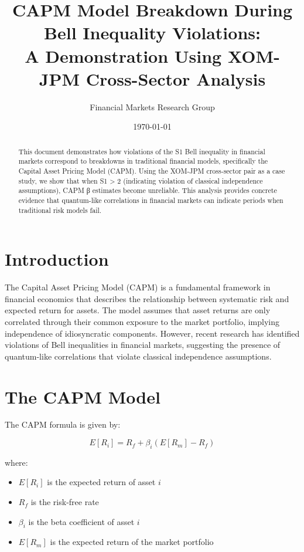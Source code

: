 \documentclass[11pt,a4paper]{article}
\title{CAPM Model Breakdown During Bell Inequality Violations: \\
A Demonstration Using XOM-JPM Cross-Sector Analysis}
\author{Financial Markets Research Group}
\date{\today}
\begin{document}
\maketitle

\begin{abstract}
This document demonstrates how violations of the S1 Bell inequality in financial markets correspond to breakdowns in traditional financial models, specifically the Capital Asset Pricing Model (CAPM). Using the XOM-JPM cross-sector pair as a case study, we show that when S1 > 2 (indicating violation of classical independence assumptions), CAPM β estimates become unreliable. This analysis provides concrete evidence that quantum-like correlations in financial markets can indicate periods when traditional risk models fail.
\end{abstract}

\section{Introduction}

The Capital Asset Pricing Model (CAPM) is a fundamental framework in financial economics that describes the relationship between systematic risk and expected return for assets. The model assumes that asset returns are only correlated through their common exposure to the market portfolio, implying independence of idiosyncratic components. However, recent research has identified violations of Bell inequalities in financial markets, suggesting the presence of quantum-like correlations that violate classical independence assumptions.

\section{The CAPM Model}

The CAPM formula is given by:

\begin{equation}
E[R_i] = R_f + \beta_i(E[R_m] - R_f)
\end{equation}

where:
\begin{itemize}
\item $E[R_i]$ is the expected return of asset $i$
\item $R_f$ is the risk-free rate
\item $\beta_i$ is the beta coefficient of asset $i$
\item $E[R_m]$ is the expected return of the market portfolio
\end{itemize}
\end{document}
